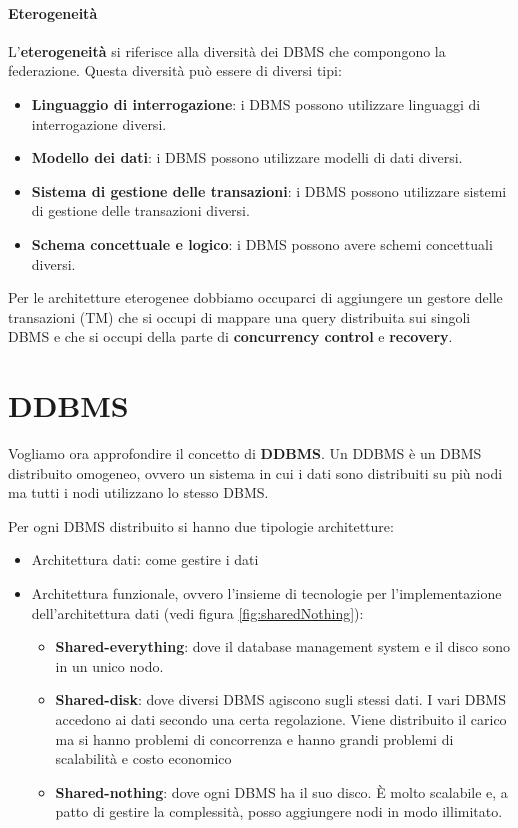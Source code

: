 \paragraph{Eterogeneità} L'\textbf{eterogeneità} si riferisce alla diversità dei DBMS
che compongono la federazione. Questa diversità può essere di diversi tipi:
\begin{itemize}
    \item \textbf{Linguaggio di interrogazione}: i DBMS possono utilizzare
          linguaggi di interrogazione diversi.
    \item \textbf{Modello dei dati}: i DBMS possono utilizzare modelli di dati
          diversi.
    \item \textbf{Sistema di gestione delle transazioni}: i DBMS possono utilizzare
          sistemi di gestione delle transazioni diversi.
    \item \textbf{Schema concettuale e logico}: i DBMS possono avere schemi concettuali
          diversi.
\end{itemize}

Per le architetture eterogenee dobbiamo occuparci di aggiungere un gestore delle
transazioni (TM) che si occupi di mappare una query distribuita sui singoli DBMS
e che si occupi della parte di \textbf{concurrency control} e \textbf{recovery}.


\section{DDBMS}
Vogliamo ora approfondire il concetto di \textbf{DDBMS}. Un DDBMS è un DBMS
distribuito omogeneo, ovvero un sistema in cui i dati sono distribuiti su più
nodi ma tutti i nodi utilizzano lo stesso DBMS.

Per ogni DBMS distribuito si hanno due tipologie architetture:
\begin{itemize}
    \item Architettura dati: come gestire i dati
    \item Architettura funzionale, ovvero l'insieme di tecnologie per l'implementazione
          dell'architettura dati (vedi figura \ref{fig:sharedNothing}):
          \begin{itemize}
              \item \textbf{Shared-everything}: dove il database management system e il
                    disco sono in un unico nodo.
              \item \textbf{Shared-disk}: dove diversi DBMS agiscono sugli stessi dati. I
                    vari DBMS accedono ai dati secondo una certa regolazione.
                    Viene distribuito il carico ma si hanno problemi di concorrenza e
                    hanno grandi problemi di scalabilità e costo economico
              \item \textbf{Shared-nothing}: dove ogni DBMS ha il suo disco. È molto
                    scalabile e, a patto di gestire la complessità, posso aggiungere nodi
                    in modo illimitato.
          \end{itemize}
\end{itemize}

